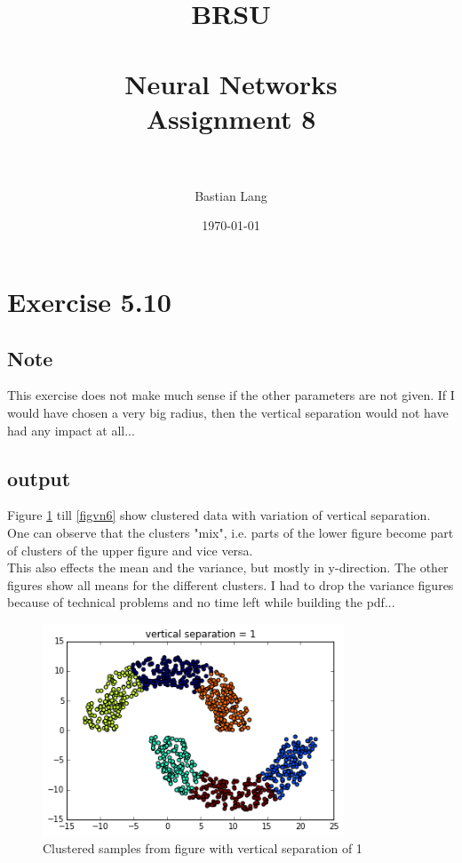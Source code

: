 \documentclass[paper=a4, fontsize=11pt]{scrartcl} %
\title{	
\normalfont \normalsize 
\textsc{BRSU} \\ [25pt] %
\horrule{0.5pt} \\[0.4cm] %
\huge Neural Networks\\Assignment 8 \\ %
\horrule{2pt} \\[0.5cm] %
}
\author{Bastian Lang} %
\date{\normalsize\today} %
\numberwithin{equation}{section} %
\numberwithin{figure}{section} %
\numberwithin{table}{section} %
\begin{document}
\maketitle %

\newpage



\section{Exercise 5.10}

\subsection{Note}
This exercise does not make much sense if the other parameters are not given. If I would have chosen a very big radius, then the vertical separation would not have had any impact at all...

\subsection{output}
Figure \ref{figv1} till \ref{figvn6} show clustered data with variation of vertical separation.\\
One can observe that the clusters "mix", i.e. parts of the lower figure become part of clusters of the upper figure and vice versa.\\

This also effects the mean and the variance, but mostly in y-direction. The other figures show all means for the different clusters. I had to drop the variance figures because of technical problems and no time left while building the pdf...


\begin{figure}[ht]
	\centering
  \includegraphics[width=0.8\textwidth]{v1.png}
	\caption{Clustered samples from figure with vertical separation of 1}
	\label{figv1}
\end{figure}
\end{document}
